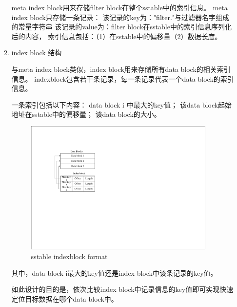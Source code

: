 \begin{enumerate}
\begin{enumerate}
	meta index block用来存储filter block在整个sstable中的索引信息。
meta index block只存储一条记录：
该记录的key为："filter."与过滤器名字组成的常量字符串
该记录的value为：filter block在sstable中的索引信息序列化后的内容，
索引信息包括：（1）在sstable中的偏移量（2）数据长度。

	\item index block 结构
	
	与meta index block类似，index block用来存储所有data block的相关索引信息。
indexblock包含若干条记录，每一条记录代表一个data block的索引信息。

一条索引包括以下内容：
data block i 中最大的key值；
该data block起始地址在sstable中的偏移量；
该data block的大小。

\begin{figure}[H]
	\centering
	\includegraphics[width=0.95\textwidth]{pdf/indexblock_format.pdf}
	\caption{sstable indexblock format}
	\label{sstable_indexblock_format}
\end{figure}

其中，data block i最大的key值还是index block中该条记录的key值。

如此设计的目的是，依次比较index block中记录信息的key值即可实现快速定位目标数据在哪个data block中。


\end{enumerate}
\end{enumerate}
